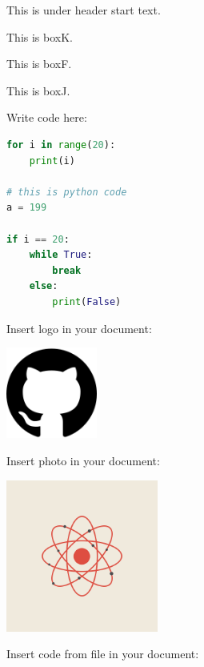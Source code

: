 \documentclass[a4paper]{article}
\begin{document}
\mtitle

\newpage

This is under header start text.

\begin{boxK}
    This is boxK.
\end{boxK}

\begin{boxF}
    This is boxF.
\end{boxF}

\begin{boxJ}
    This is boxJ.
\end{boxJ}

Write code here:
\begin{lstlisting}[language=Python]
for i in range(20):
    print(i)

# this is python code
a = 199

if i == 20:
    while True:
        break
    else:
        print(False)
\end{lstlisting}

Insert logo in your document:
\begin{center}
    \includegraphics[width=3cm]{constants/github.png}
\end{center}

\newpage
Insert photo in your document:
\begin{center}
    \includegraphics[width=5cm]{figures/atom.png}
\end{center}

Insert code from file in your document:

\mgoodbye
\end{document}
